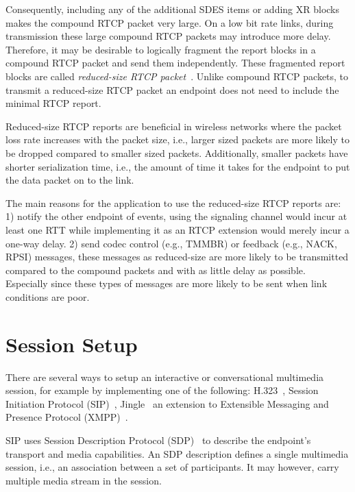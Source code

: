Consequently, including any of the additional SDES items or adding XR blocks
makes the compound RTCP packet very large. On a low bit rate links, during
transmission these large compound RTCP packets may introduce more delay.
Therefore, it may be desirable to logically fragment the report blocks in a
compound RTCP packet and send them independently. These fragmented report
blocks are called \emph{reduced-size RTCP packet}~\cite{rfc5506}. Unlike
compound RTCP packets, to transmit a reduced-size RTCP packet an endpoint does
not need to include the minimal RTCP report.

Reduced-size RTCP reports are beneficial in wireless networks where the packet
loss rate increases with the packet size, i.e., larger sized packets are more
likely to  be dropped compared to smaller sized packets. Additionally, smaller
packets have shorter serialization time, i.e., the amount of time it takes for
the endpoint to put the data packet on to the link.

The main reasons for the application to use the reduced-size RTCP reports are:
1) notify the other endpoint of events, using the signaling channel would
incur at least one RTT while implementing it as an RTCP extension would merely
incur a one-way delay. 2) send codec control (e.g., TMMBR) or feedback (e.g.,
NACK, RPSI) messages, these messages as reduced-size are more likely to be
transmitted compared to the compound packets and with as little delay as
possible. Especially since these types of messages are more likely to be sent
when link conditions are poor.


\section{Session Setup}


There are several ways to setup an interactive or conversational multimedia
session, for example by implementing one of the following:
H.323~\cite{H.323}, Session Initiation Protocol (SIP)~\cite{rfc3261},
Jingle~\cite{XEP-0166} an extension to Extensible Messaging and Presence
Protocol (XMPP)~\cite{rfc6120}. 

SIP uses Session Description Protocol (SDP)~\cite{rfc4566} to describe the
endpoint's transport and media capabilities. An SDP description defines a
single multimedia session, i.e., an association between a set of participants.
It may however, carry multiple media stream in the session.

